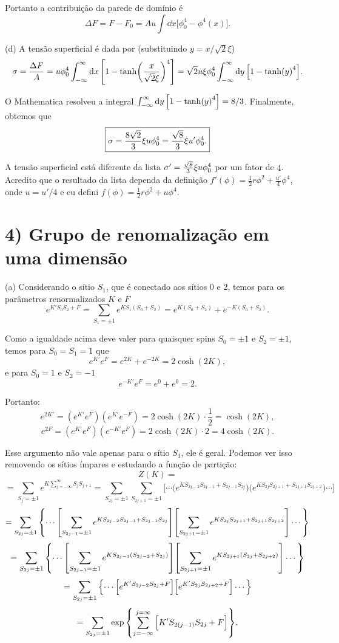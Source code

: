 \documentclass[a4paper,10pt]{article}
\begin{document}
Portanto a contribuição da parede de domínio é
$$
\boxed{\Delta F = F - F_0 = Au \int \dd{x} \Big[\phi_0^4 - \phi^4(x)\Big].}
$$

\n

(d) A tensão superficial é dada por (substituindo $y = x/\sqrt{2} \xi$)
$$
\sigma = \frac{\Delta F}{A} = u \phi_0^4 \int_{-\infty}^{\infty} \dd{x} \qty[1 - \tanh(\frac{x}{\sqrt{2} \xi})^4] =
\sqrt{2} u \xi \phi_0^4 \int_{-\infty}^{\infty} \dd{y} \qty[1 - \tanh(y)^4].
$$

O Mathematica resolveu a integral $\int_{-\infty}^{\infty} \dd{y} \qty[1 - \tanh(y)^4] = 8/3$. Finalmente, obtemos que
$$
\boxed{\sigma = \frac{8\sqrt{2}}{3} \xi u \phi_0^4 = \frac{\sqrt{8}}{3} \xi u' \phi_0^4.}
$$

A tensão superficial está diferente da lista $\sigma' = \frac{\sqrt{8}}{3} \xi u \phi_0^4$ por um fator de $4$. Acredito que o resultado da lista dependa da definição $f'(\phi) = \frac{1}{2} r\phi^2 + \frac{u'}{4} \phi^4$, onde $\boxed{u = u'/4}$ e eu defini $f(\phi) = \frac{1}{2} r\phi^2 + u \phi^4$.


\pagebreak


\section*{4) Grupo de renomalização em uma dimensão}

(a) Considerando o sítio $S_1$, que é conectado aos sítios 0 e 2, temos para os parâmetros renormalizados $K$ e $F$
$$
e^{K'S_0 S_2 + F} = \sum_{S_1 = \pm 1} e^{K S_1(S_0 + S_2)} = e^{K(S_0+S_2)} + e^{-K(S_0+S_2)}.
$$

Como a igualdade acima deve valer para quaisquer spins $S_0 = \pm 1$ e $S_2 = \pm 1$, temos para $S_0 = S_1 = 1$ que
$$
e^{K'} e^{F} = e^{2K} + e^{-2K} = 2 \cosh(2K),
$$
e para $S_0 = 1$ e $S_2 = -1$
$$
e^{-K'} e^{F} = e^0 + e^0 = 2.
$$

Portanto:
$$
\boxed{ e^{2K'} = (e^{K'}e^{F}) (e^{K'}e^{-F}) = 2 \cosh(2K) \cdot \frac{1}{2} = \cosh(2K), }
$$
$$
e^{2F} =  (e^{K'}e^{F}) (e^{-K'}e^{F}) = 2 \cosh(2K) \cdot 2 = 4 \cosh(2K).
$$

Esse argumento não vale apenas para o sítio $S_1$, ele é geral. Podemos ver isso removendo os sítios ímpares e estudando a função de partição:
$$
Z(K) =
$$
$$
= \sum_{S_j = \pm 1} e^{K \sum_{j=-\infty}^{\infty} S_j S_{j+1}}
= \sum_{S_{2j} = \pm 1} \sum_{S_{2j + 1} = \pm 1}
\Big[
\cdots
\Big( e^{K S_{2j-2} S_{2j-1} + S_{2j-1} S_{2j}} \Big)
\Big( e^{K S_{2j} S_{2j+1} + S_{2j+1} S_{2j+2}} \Big)
\cdots
\Big]
$$
$$
= \sum_{S_{2j} = \pm 1}
\qty{
\cdots
\qty[ \sum_{S_{2j-1} = \pm 1} e^{K S_{2j-2} S_{2j-1} + S_{2j-1} S_{2j}} ]
\qty[ \sum_{S_{2j+1} = \pm 1} e^{K S_{2j} S_{2j+1} + S_{2j+1} S_{2j+2}} ]
\cdots
}
$$
$$
= \sum_{S_{2j} = \pm 1}
\qty{
\cdots
\qty[ \sum_{S_{2j-1} = \pm 1} e^{K S_{2j-1} (S_{2j-2} + S_{2j})} ]
\qty[ \sum_{S_{2j+1} = \pm 1} e^{K S_{2j+1} (S_{2j} + S_{2j+2})} ]
\cdots
}
$$
$$
= \sum_{S_{2j} = \pm 1}
\qty{
\cdots
\Big[e^{K'S_{2j-2} S_{2j} + F}\Big]
\Big[e^{K'S_{2j} S_{2j+2} + F}\Big]
\cdots
}
$$
$$
= \sum_{S_{2j} = \pm 1} \exp\qty{ \sum_{j=-\infty}^{j=\infty} \Big[K' S_{2(j-1)}S_{2j} + F\Big] }.
$$
\end{document}
